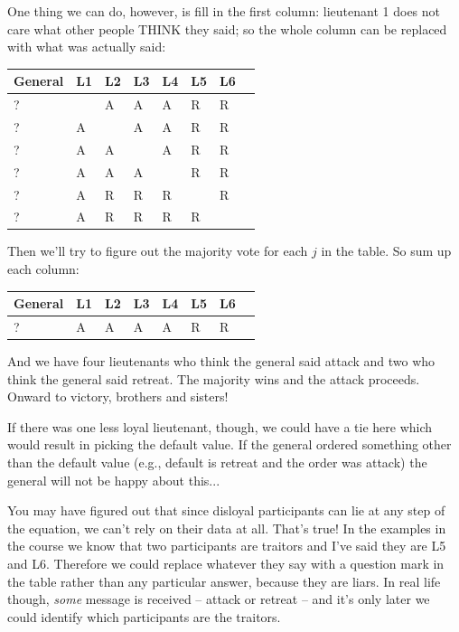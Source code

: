 One thing we can do, however, is fill in the first column: lieutenant 1 does not care what other people THINK they said; so the whole column can be replaced with what was actually said:

\begin{center}
	\begin{tabular}{|l|l|l|l|l|l|l|l|}
		\hline
		General & L1 & L2 & L3 & L4 & L5 & L6 \\
		\hline
		?       & ~  & A  & A  & A  & R  & R  \\ \hline
		?       & A  & ~  & A  & A  & R  & R  \\ \hline
		?       & A  & A  & ~  & A  & R  & R  \\ \hline
		?       & A  & A  & A  & ~  & R  & R  \\ \hline
		?       & A  & R  & R  & R  & ~  & R  \\ \hline
		?       & A  & R  & R  & R  & R  & ~  \\ \hline
	\end{tabular}
\end{center}

Then we'll try to figure out the majority vote for each $j$ in the table. So sum up each column:

\begin{center}
	\begin{tabular}{|l|l|l|l|l|l|l|l|}
		\hline
		General & L1 & L2 & L3 & L4 & L5 & L6 \\
		\hline
		?       & A  & A  & A  & A  & R  & R  \\
		\hline
	\end{tabular}
\end{center}

And we have four lieutenants who think the general said attack and two who think the general said retreat. The majority wins and the attack proceeds. Onward to victory, brothers and sisters!

If there was one less loyal lieutenant, though, we could have a tie here which would result in picking the default value. If the general ordered something other than the default value (e.g., default is retreat and the order was attack) the general will not be happy about this...

You may have figured out that since disloyal participants can lie at any step of the equation, we can't rely on their data at all. That's true! In the examples in the course we know that two participants are traitors and I've said they are L5 and L6. Therefore we could replace whatever they say with a question mark in the table rather than any particular answer, because they are liars. In real life though, \textit{some} message is received -- attack or retreat -- and it's only later we could identify which participants are the traitors.

